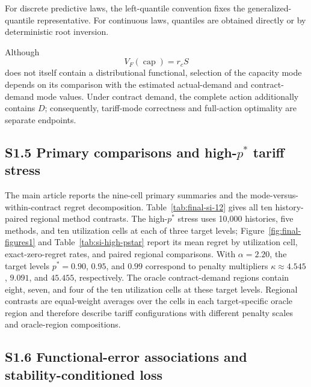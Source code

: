 \documentclass[]{interact}
\begin{document}
For discrete predictive laws, the left-quantile convention fixes the
generalized-quantile representative. For continuous laws, quantiles
are obtained directly or by deterministic root inversion.

Although
\[
V_F(\operatorname{cap})=r_cS
\]
does not itself contain a distributional functional, selection of the
capacity mode depends on its comparison with the estimated
actual-demand and contract-demand mode values. Under contract demand,
the complete action additionally contains \(D\); consequently,
tariff-mode correctness and full-action optimality are separate
endpoints.




\subsection*{S1.5 Primary comparisons and high-$p^*$ tariff stress}

The main article reports the nine-cell primary summaries and the
mode-versus-within-contract regret decomposition. Table~\ref{tab:final-si-12} gives all ten
history-paired regional method contrasts. The high-$p^*$ stress uses
10,000 histories, five methods, and ten utilization cells at each of
three target levels; Figure~\ref{fig:final-figures1} and
Table~\ref{tab:si-high-pstar} report its mean regret by utilization
cell, exact-zero-regret rates, and paired regional comparisons.
With $\alpha=2.20$, the target levels $p^*=0.90$, $0.95$, and $0.99$
correspond to penalty multipliers $\kappa\approx4.545$, $9.091$, and
$45.455$, respectively. The oracle contract-demand regions contain
eight, seven, and four of the ten utilization cells at these target
levels. Regional contrasts are equal-weight averages over the cells in
each target-specific oracle region and therefore describe tariff
configurations with different penalty scales and oracle-region
compositions.


\subsection*{S1.6 Functional-error associations and stability-conditioned loss}
\end{document}
